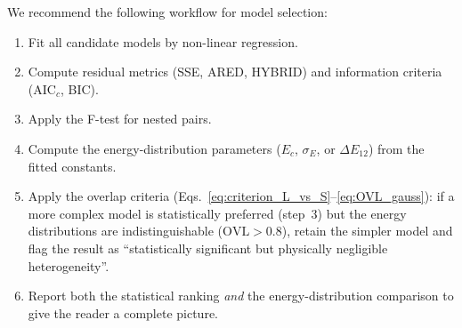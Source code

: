 	We recommend the following workflow for model selection:
	\begin{enumerate}
		\item Fit all candidate models by non-linear regression.
		\item Compute residual metrics (SSE, ARED, HYBRID) and
		information criteria (AIC$_c$, BIC).
		\item Apply the F-test for nested pairs.
		\item Compute the energy-distribution parameters ($E_c$,
		$\sigma_E$, or $\Delta E_{12}$) from the fitted constants.
		\item Apply the overlap criteria
		(Eqs.~\eqref{eq:criterion_L_vs_S}--\eqref{eq:OVL_gauss}):
		if a more complex model is statistically preferred (step~3)
		but the energy distributions are indistinguishable
		($\mathrm{OVL} > 0.8$), retain the simpler model and flag
		the result as ``statistically significant but physically
		negligible heterogeneity''.
		\item Report both the statistical ranking \emph{and} the
		energy-distribution comparison to give the reader a complete
		picture.
	\end{enumerate}

